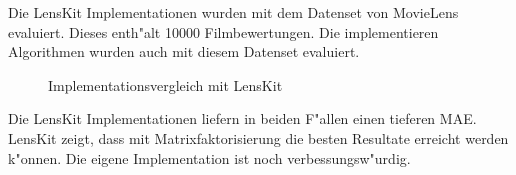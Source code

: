\documentclass[a4paper, 12pt]{article}
\begin{document}
Die LensKit Implementationen wurden mit dem Datenset von MovieLens evaluiert. Dieses enth"alt 10000 Filmbewertungen. Die implementieren Algorithmen wurden auch mit diesem Datenset evaluiert.
\begin{figure}
  \centering
{} 
  
  \caption{Implementationsvergleich mit LensKit}
  \label{fig:compareimpl}
\end{figure}

Die LensKit Implementationen liefern in beiden F"allen einen tieferen MAE. LensKit zeigt, dass mit Matrixfaktorisierung die besten Resultate erreicht werden k"onnen. Die eigene Implementation ist noch verbessungsw"urdig.



\end{document}
